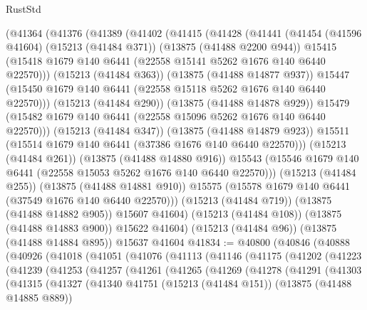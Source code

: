 \begin{lexlean}{RustStd}
\begin{coremodule}
    (@41364
      (@41376
        (@41389
          (@41402
            (@41415
              (@41428
                (@41441
                  (@41454
                    (@41596 @41604)
                    (@15213 (@41484 @371))
                    (@13875 (@41488 @2200 @944))
                    @15415
                    (@15418 @1679 @140 @6441 (@22558 @15141 @5262 @1676 @140 @6440 @22570)))
                  (@15213 (@41484 @363))
                  (@13875 (@41488 @14877 @937))
                  @15447
                  (@15450 @1679 @140 @6441 (@22558 @15118 @5262 @1676 @140 @6440 @22570)))
                (@15213 (@41484 @290))
                (@13875 (@41488 @14878 @929))
                @15479
                (@15482 @1679 @140 @6441 (@22558 @15096 @5262 @1676 @140 @6440 @22570)))
              (@15213 (@41484 @347))
              (@13875 (@41488 @14879 @923))
              @15511
              (@15514 @1679 @140 @6441 (@37386 @1676 @140 @6440 @22570)))
            (@15213 (@41484 @261))
            (@13875 (@41488 @14880 @916))
            @15543
            (@15546 @1679 @140 @6441 (@22558 @15053 @5262 @1676 @140 @6440 @22570)))
          (@15213 (@41484 @255))
          (@13875 (@41488 @14881 @910))
          @15575
          (@15578 @1679 @140 @6441 (@37549 @1676 @140 @6440 @22570)))
        (@15213 (@41484 @719))
        (@13875 (@41488 @14882 @905))
        @15607
        @41604)
      (@15213 (@41484 @108))
      (@13875 (@41488 @14883 @900))
      @15622
      @41604)
    (@15213 (@41484 @96))
    (@13875 (@41488 @14884 @895))
    @15637
    @41604
@41834 := @40800
    (@40846
      (@40888
        (@40926
          (@41018
            (@41051
              (@41076
                (@41113
                  (@41146
                    (@41175
                      (@41202
                        (@41223
                          (@41239
                            (@41253
                              (@41257
                                (@41261
                                  (@41265
                                    (@41269
                                      (@41278
                                        (@41291
                                          (@41303
                                            (@41315
                                              (@41327
                                                (@41340
                                                  @41751
                                                  (@15213 (@41484 @151))
                                                  (@13875 (@41488 @14885 @889))

\end{coremodule}
\end{lexlean}

